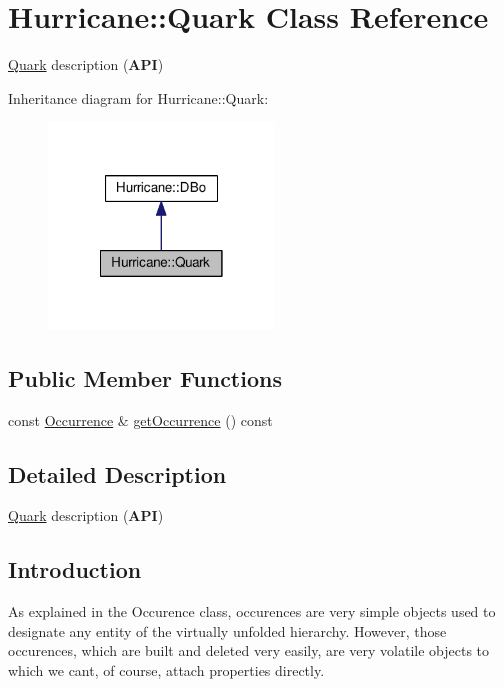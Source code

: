 \hypertarget{classHurricane_1_1Quark}{}\section{Hurricane\+:\+:Quark Class Reference}
\label{classHurricane_1_1Quark}


\hyperlink{classHurricane_1_1Quark}{Quark} description ({\bfseries A\+PI})  




Inheritance diagram for Hurricane\+:\+:Quark\+:\nopagebreak
\begin{figure}[H]
\begin{center}
\leavevmode
\includegraphics[width=170pt]{classHurricane_1_1Quark__inherit__graph}
\end{center}
\end{figure}
\subsection*{Public Member Functions}
\begin{DoxyCompactItemize}
\item 
const \hyperlink{classHurricane_1_1Occurrence}{Occurrence} \& \hyperlink{classHurricane_1_1Quark_a22ee192574dae1546ec17d6c549b2ca0}{get\+Occurrence} () const
\end{DoxyCompactItemize}


\subsection{Detailed Description}
\hyperlink{classHurricane_1_1Quark}{Quark} description ({\bfseries A\+PI}) 

\hypertarget{classHurricane_1_1Quark_secQuarkIntro}{}\subsection{Introduction}\label{classHurricane_1_1Quark_secQuarkIntro}
As explained in the Occurence class, occurences are very simple objects used to designate any entity of the virtually unfolded hierarchy. However, those occurences, which are built and deleted very easily, are very volatile objects to which we can\textquotesingle{}t, of course, attach properties directly.

